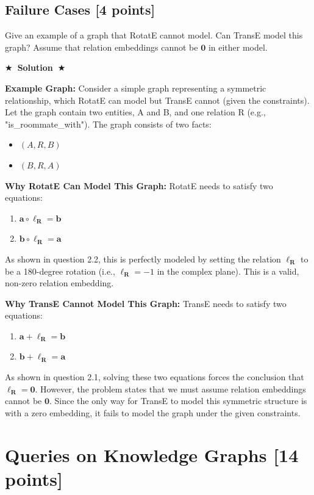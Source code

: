 \documentclass{article}
\numberwithin{figure}{section}
\newcommand{\Solution}[1]{%
    {%
        \medskip
        \color{red}
        \bf $\bigstar$~\sf\textbf{Solution}~$\bigstar$ \sf
        #1
    }
    \bigskip
}
\begin{document}
\subsection{Failure Cases [4 points]}
Give an example of a graph that RotatE cannot model. Can TransE model this graph? Assume that relation embeddings cannot be $\mathbf{0}$ in either model.

\Solution{
	\textbf{Example Graph:}
	Consider a simple graph representing a symmetric relationship, which RotatE can model but TransE cannot (given the constraints).
	Let the graph contain two entities, A and B, and one relation R (e.g., "is\_roommate\_with"). The graph consists of two facts:
	\begin{itemize}
		\item $(A, R, B)$
		\item $(B, R, A)$
	\end{itemize}
	
	\textbf{Why RotatE Can Model This Graph:}
	RotatE needs to satisfy two equations:
	\begin{enumerate}
		\item $\mathbf{a} \circ \boldsymbol{\ell_R} = \mathbf{b}$
		\item $\mathbf{b} \circ \boldsymbol{\ell_R} = \mathbf{a}$
	\end{enumerate}
	As shown in question 2.2, this is perfectly modeled by setting the relation $\boldsymbol{\ell_R}$ to be a 180-degree rotation (i.e., $\boldsymbol{\ell_R} = -1$ in the complex plane). This is a valid, non-zero relation embedding.
	
	\textbf{Why TransE Cannot Model This Graph:}
	TransE needs to satisfy two equations:
	\begin{enumerate}
		\item $\mathbf{a} + \boldsymbol{\ell_R} = \mathbf{b}$
		\item $\mathbf{b} + \boldsymbol{\ell_R} = \mathbf{a}$
	\end{enumerate}
	As shown in question 2.1, solving these two equations forces the conclusion that $\boldsymbol{\ell_R} = \mathbf{0}$. However, the problem states that we must assume relation embeddings cannot be $\mathbf{0}$. Since the only way for TransE to model this symmetric structure is with a zero embedding, it fails to model the graph under the given constraints.
}


\section{Queries on Knowledge Graphs [14 points]}
\end{document}
